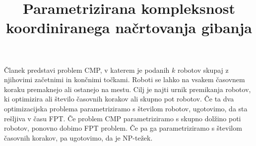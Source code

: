 \documentclass{article}
\title{Parametrizirana kompleksnost koordiniranega načrtovanja gibanja}
\begin{document}
\noindent
Članek predstavi problem CMP, v katerem je podanih $k$ robotov skupaj z njihovimi začetnimi in končnimi točkami. Roboti se lahko na vsakem časovnem koraku premaknejo ali ostanejo na mestu. Cilj je najti urnik premikanja robotov, ki optimizira ali število časovnih korakov ali skupno pot robotov.
Če ta dva optimizacijska problema parametriziramo s številom robotov, ugotovimo, da sta rešljiva v času FPT.
Če problem CMP parametriziramo s skupno dolžino poti robotov, ponovno dobimo FPT problem.
Če pa ga parametriziramo s številom časovnih korakov, pa ugotovimo, da je NP-težek. 
\end{document}
